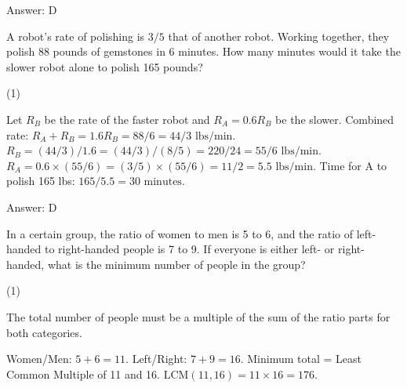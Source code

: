 \documentclass[11pt,paper=a4,answers]{exam}
\begin{document}
\begin{questions}
\begin{solution}
Answer: \colorbox{yellow!100}{D}
\end{solution}

\vspace{1cm}

\question
A robot's rate of polishing is $3/5$ that of another robot. Working together, they polish 88 pounds of gemstones in 6 minutes. How many minutes would it take the slower robot alone to polish 165 pounds?

\begin{tasks}(1)
    
\end{tasks}

\begin{solution}
\begin{center}
Let $R_B$ be the rate of the faster robot and $R_A = 0.6R_B$ be the slower.
\vspace{5pt}
Combined rate: $R_A + R_B = 1.6R_B = 88/6 = 44/3 \text{ lbs/min}$.
\vspace{5pt}
$R_B = (44/3) / 1.6 = (44/3) / (8/5) = 220 / 24 = 55/6 \text{ lbs/min}$.
\vspace{5pt}
$R_A = 0.6 \times (55/6) = (3/5) \times (55/6) = 11/2 = 5.5 \text{ lbs/min}$.
\vspace{10pt}
Time for A to polish 165 lbs: $165 / 5.5 = 30 \text{ minutes}$.
\end{center}

Answer: \colorbox{yellow!100}{D}
\end{solution}

\vspace{1cm}

\question
In a certain group, the ratio of women to men is 5 to 6, and the ratio of left-handed to right-handed people is 7 to 9. If everyone is either left- or right-handed, what is the minimum number of people in the group?

\begin{tasks}(1)
    
\end{tasks}

\begin{solution}
The total number of people must be a multiple of the sum of the ratio parts for both categories.
\vspace{5pt}
\begin{center}
Women/Men: $5 + 6 = 11$.
\vspace{5pt}
Left/Right: $7 + 9 = 16$.
\vspace{5pt}
Minimum total = Least Common Multiple of 11 and 16.
\vspace{5pt}
$\text{LCM}(11, 16) = 11 \times 16 = 176$.
\end{center}


\end{solution}
\end{questions}
\end{document}
